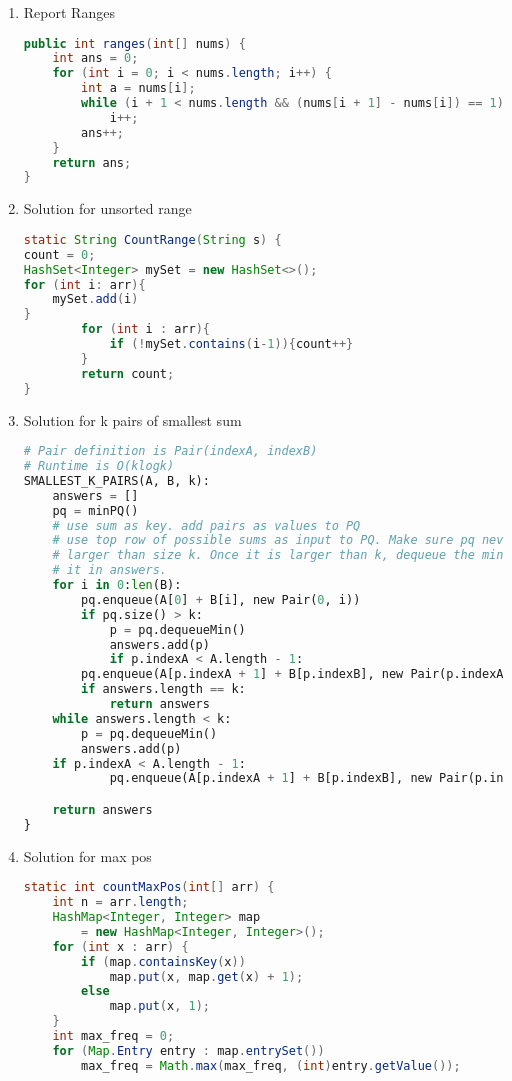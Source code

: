 \documentclass{article}
\begin{document}
\begin{enumerate}

\item Report Ranges

\begin{lstlisting}[language=Java]
public int ranges(int[] nums) {
    int ans = 0;
    for (int i = 0; i < nums.length; i++) {
        int a = nums[i];
        while (i + 1 < nums.length && (nums[i + 1] - nums[i]) == 1)
            i++;
        ans++;
    }
    return ans;
}
\end{lstlisting}


\item Solution for unsorted range
\begin{lstlisting}[language=Java]
static String CountRange(String s) {
count = 0;
HashSet<Integer> mySet = new HashSet<>();
for (int i: arr){
    mySet.add(i)
}
        for (int i : arr){
            if (!mySet.contains(i-1)){count++}
        }
        return count;
}
\end{lstlisting}


\item Solution for k pairs of smallest sum
\begin{lstlisting}[language=python]
# Pair definition is Pair(indexA, indexB)
# Runtime is O(klogk)
SMALLEST_K_PAIRS(A, B, k):
    answers = []
    pq = minPQ()
    # use sum as key. add pairs as values to PQ
    # use top row of possible sums as input to PQ. Make sure pq never grows
    # larger than size k. Once it is larger than k, dequeue the min and place
    # it in answers.
    for i in 0:len(B):
        pq.enqueue(A[0] + B[i], new Pair(0, i))
        if pq.size() > k:
            p = pq.dequeueMin()
            answers.add(p)
            if p.indexA < A.length - 1:
		pq.enqueue(A[p.indexA + 1] + B[p.indexB], new Pair(p.indexA + 1, p.indexB))
        if answers.length == k:
            return answers
    while answers.length < k:
        p = pq.dequeueMin()
        answers.add(p)
	if p.indexA < A.length - 1:
            pq.enqueue(A[p.indexA + 1] + B[p.indexB], new Pair(p.indexA + 1, p.indexB))

    return answers
}
\end{lstlisting}

\item Solution for max pos
\begin{lstlisting}[language=Java]
static int countMaxPos(int[] arr) {
    int n = arr.length;
    HashMap<Integer, Integer> map
        = new HashMap<Integer, Integer>();
    for (int x : arr) {
        if (map.containsKey(x))
            map.put(x, map.get(x) + 1);
        else
            map.put(x, 1);
    }
    int max_freq = 0;
    for (Map.Entry entry : map.entrySet())
        max_freq = Math.max(max_freq, (int)entry.getValue());


\end{lstlisting}
\end{enumerate}
\end{document}
